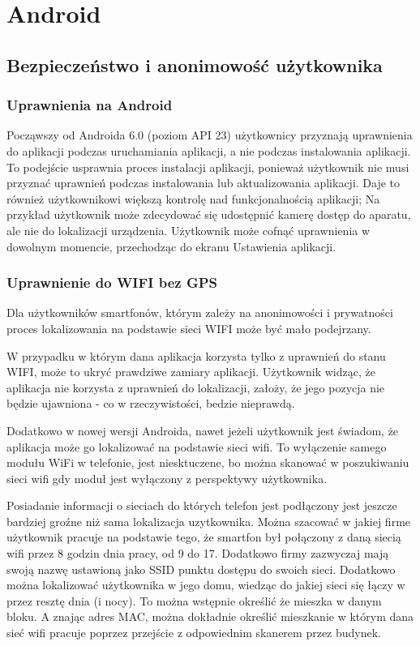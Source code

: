 \chapter{Android}
\section{Bezpieczeństwo i anonimowość użytkownika}
\subsection{Uprawnienia na Android}

Począwszy od Androida 6.0 (poziom API 23) użytkownicy przyznają uprawnienia do aplikacji podczas uruchamiania aplikacji, a nie podczas instalowania aplikacji. To podejście usprawnia proces instalacji aplikacji, ponieważ użytkownik nie musi przyznać uprawnień podczas instalowania lub aktualizowania aplikacji. Daje to również użytkownikowi większą kontrolę nad funkcjonalnością aplikacji; Na przykład użytkownik może zdecydować się udostępnić kamerę dostęp do aparatu, ale nie do lokalizacji urządzenia. Użytkownik może cofnąć uprawnienia w dowolnym momencie, przechodząc do ekranu Ustawienia aplikacji.\cite{NewPermissionsModelInAndroid60}

\subsection{Uprawnienie do WIFI bez GPS}
Dla użytkowników smartfonów, którym zależy na anonimowości i prywatności proces lokalizowania na podstawie sieci WIFI może być mało podejrzany.

W przypadku w którym dana aplikacja korzysta tylko z uprawnień do stanu WIFI, może to ukryć prawdziwe zamiary aplikacji. Użytkownik widząc, że aplikacja nie korzysta z uprawnień do lokalizacji, założy, że jego pozycja nie będzie ujawniona - co w rzeczywistości, bedzie nieprawdą.

Dodatkowo w nowej wersji Androida, nawet jeżeli użytkownik jest świadom, że aplikacja może go lokalizować na podstawie sieci wifi. To wyłączenie samego modułu WiFi w telefonie, jest niesktuczene, bo można skanować w poszukiwaniu sieci wifi gdy moduł jest wyłączony z perspektywy użytkownika.

Posiadanie informacji o sieciach do których telefon jest podłączony jest jeszcze bardziej groźne niż sama lokalizacja uzytkownika. Można szacować w jakiej firme użytkownik pracuje na podstawie tego, że smartfon był połączony z daną siecią wifi przez 8 godzin dnia pracy, od 9 do 17. Dodatkowo firmy zazwyczaj mają swoją nazwę ustawioną jako SSID punktu dostępu do swoich sieci. Dodatkowo można lokalizować użytkownika w jego domu, wiedząc do jakiej sieci się łączy w przez resztę dnia (i nocy). To można wstępnie określić że mieszka w danym bloku. A znając adres MAC, można dokładnie określić mieszkanie w którym dana sieć wifi pracuje poprzez przejście z odpowiednim skanerem przez budynek. 

